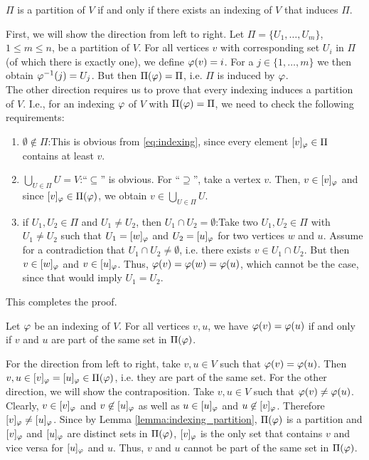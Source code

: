 \pagebreak 
\begin{lemmarep}
    $\Pi$ is a partition of $V$ if and only if there exists an indexing of $V$ that induces $\Pi$.\label{lemma:indexing_partition}
\end{lemmarep}
\begin{appendixproof}
    First, we will show the direction from left to right. Let $\Pi = \{U_1,\dots,U_m\}$, $1\leq m \leq n$, be a partition of $V$. For all vertices $v$ with corresponding set $U_i$ in $\Pi$ (of which there is exactly one), we define $\varphi(v) = i$. For a $j \in \{1,\dots,m\}$ we then obtain $\varphi^{-1}(j) = U_j$. But then $\Pi(\varphi) = \Pi$, i.e. $\Pi$ is induced by $\varphi$. 
    \\
    The other direction requires us to prove that every indexing induces a partition of $V$. I.e., for an indexing $\varphi$ of $V$ with $\Pi(\varphi)=\Pi$, we need to check the following requirements:
    \begin{enumerate}
        \item $\emptyset \not\in \Pi$:\quad This is obvious from \eqref{eq:indexing}, since every element $[v]_\varphi \in \Pi$ contains at least $v$. %
        \item $\bigcup_{U \in \Pi} U = V$:\quad ``$\subseteq$'' is obvious. For ``$\supseteq$'', take a vertex $v$. Then, $v \in [v]_\varphi$ and since $[v]_\varphi \in \Pi(\varphi)$, we obtain $v \in \bigcup_{U \in \Pi} U$.
        \item if $U_1,U_2 \in \Pi$ and $U_1 \neq U_2$, then $U_1 \cap U_2 = \emptyset$:\quad Take two $U_1, U_2 \in \Pi$ with $U_1 \neq U_2$ such that $U_1 = [w]_\varphi$ and $U_2 = [u]_\varphi$ for two vertices $w$ and $u$. Assume for a contradiction that $U_1 \cap U_2 \neq \emptyset$, i.e. there exists $v \in U_1 \cap U_2$. But then $v \in [w]_\varphi$ and $v \in [u]_\varphi$. Thus, $\varphi(v) = \varphi(w) = \varphi(u)$, which cannot be the case, since that would imply $U_1 = U_2$.
    \end{enumerate}
    This completes the proof.
\end{appendixproof}

\begin{lemmarep}
    Let $\varphi$ be an indexing of $V$. For all vertices $v,u$, we have $\varphi(v) = \varphi(u)$ if and only if $v$ and $u$ are part of the same set in $\Pi(\varphi)$. \label{lemma:indexing_same_set}
\end{lemmarep}
\begin{appendixproof}
    For the direction from left to right, take $v,u\in V$ such that $\varphi(v)=\varphi(u)$. Then $v,u \in [v]_\varphi = [u]_\varphi \in \Pi(\varphi)$, i.e. they are part of the same set. For the other direction, we will show the contraposition. Take $v,u\in V$ such that $\varphi(v)\neq \varphi(u)$. Clearly, $v \in [v]_\varphi$ and $v \not\in [u]_\varphi$ as well as $u \in [u]_\varphi$ and $u \not\in [v]_\varphi$. Therefore $[v]_\varphi \neq [u]_\varphi$. Since by Lemma \ref{lemma:indexing_partition}, $\Pi(\varphi)$ is a partition and $[v]_\varphi$ and $[u]_\varphi$ are distinct sets in $\Pi(\varphi)$, $[v]_\varphi$ is the only set that contains $v$ and vice versa for $[u]_\varphi$ and $u$. Thus, $v$ and $u$ cannot be part of the same set in $\Pi(\varphi)$. 
\end{appendixproof}


